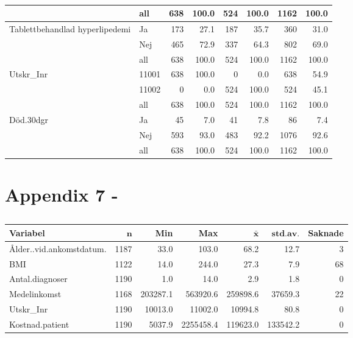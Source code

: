 \begin{table}[ht]
{\begin{tabular}{ll|rr|rr|rr}
   \hline
 & all & 638 & 100.0 & 524 & 100.0 & 1162 & 100.0 \\ 
   \hline
\hline
Tablettbehandlad hyperlipedemi & Ja & 173 & 27.1 & 187 & 35.7 & 360 & 31.0 \\ 
   & Nej & 465 & 72.9 & 337 & 64.3 & 802 & 69.0 \\ 
   \hline
 & all & 638 & 100.0 & 524 & 100.0 & 1162 & 100.0 \\ 
   \hline
\hline
Utskr\_Inr & 11001 & 638 & 100.0 & 0 & 0.0 & 638 & 54.9 \\ 
   & 11002 & 0 & 0.0 & 524 & 100.0 & 524 & 45.1 \\ 
   \hline
 & all & 638 & 100.0 & 524 & 100.0 & 1162 & 100.0 \\ 
   \hline
\hline
Död.30dgr & Ja & 45 & 7.0 & 41 & 7.8 & 86 & 7.4 \\ 
   & Nej & 593 & 93.0 & 483 & 92.2 & 1076 & 92.6 \\ 
   \hline
 & all & 638 & 100.0 & 524 & 100.0 & 1162 & 100.0 \\ 
   \hline
\hline
\end{tabular}
}
\caption{} 
\label{}
\end{table}


\newpage
\section{Appendix 7 - }

\begin{table}[ht]
\centering
{\footnotesize
\begin{tabular}{lrrrrrr}
 \textbf{Variabel} & $\mathbf{n}$ & \textbf{Min} & \textbf{Max} & $\mathbf{\bar{x}}$ & $\mathbf{std.av.}$ & \textbf{Saknade} \\ 
  \hline
Ålder..vid.ankomstdatum. & 1187 &     33.0 &     103.0 &     68.2 &     12.7 &  3 \\ 
  BMI & 1122 &     14.0 &     244.0 &     27.3 &      7.9 & 68 \\ 
  Antal.diagnoser & 1190 &      1.0 &      14.0 &      2.9 &      1.8 &  0 \\ 
  Medelinkomst & 1168 & 203287.1 &  563920.6 & 259898.6 &  37659.3 & 22 \\ 
  Utskr\_Inr & 1190 &  10013.0 &   11002.0 &  10994.8 &     80.8 &  0 \\ 
  Kostnad.patient & 1190 &   5037.9 & 2255458.4 & 119623.0 & 133542.2 &  0 \\ 
  \end{tabular}
}
\caption{} 
\label{}
\end{table}



